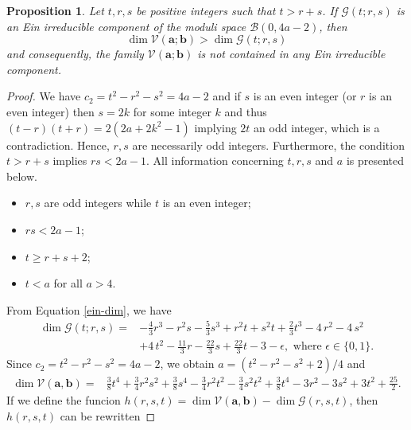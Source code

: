 \documentclass[twoside,reqno]{amsart}
\theoremstyle{plain}
\newtheorem{proposition}[theorem]{Proposition}
\begin{document}
\begin{proposition}\label{prop-dim1}
Let $t, r, s$ be positive integers such that $t>r+s$. If $\mathcal{G}(t; r,s)$ is an Ein irreducible component of the 
moduli space $\mathcal{B}(0,4a-2)$, then 
$$\dim\mathcal{V}(\boldsymbol{a}; \boldsymbol{b})>\dim \mathcal{G}(t; r,s)$$
and consequently, the 
family $\mathcal{V}(\boldsymbol{a}; \boldsymbol{b})$ is not contained in any Ein irreducible component.
\end{proposition}
%
\begin{proof}
We have $c_2=t^2-r^2-s^2=4a-2$ and if $s$ is an even integer (or $r$ is an even integer) then $s=2k$ for some integer $k$ and thus $(t-r)(t+r)=2(2a+2k^2-1)$ implying $2t$ an odd integer, which is a contradiction. Hence, $r,s$ are necessarily odd integers. Furthermore, the condition $t>r+s$ implies $rs<2a-1$. All information concerning $t, r, s$ and $a$ is presented below.
\begin{itemize}
    \item $r, s$ are odd integers while $t$ is an even integer;
    \item $rs<2a-1$;
\item $t\geq r+s+2$;
    \item $t<a$ for all $a>4$.
\end{itemize}

From Equation \eqref{ein-dim}, we have
\begin{eqnarray*}
 \dim \mathcal{G}(t; r,s)=&-\frac{4}{3}r^{3}-r^{2}s-\frac{5}{3}s^{3}+r^{2}t+s^{2}t+\frac{2}{3}t^{3}-4\,r^{2}-4\,s^{2}\\
 &+4\,t^{2}-\frac{11}{3}r-\frac{22}{3}s+\frac{22}{3}t-3-\epsilon, \mbox{ where } \epsilon \in\{0,1\}.   
\end{eqnarray*}
Since $c_2=t^2-r^2-s^2=4a-2$, we obtain $a=(t^2-r^2-s^2+2)/4$ and
$$\begin{matrix}
\dim \mathcal{V}(\boldsymbol{a},\boldsymbol{b})= & \frac{3}{8}t^{4}+\frac{3}{4}r^{2}s^{2}+\frac{3}{8}s^{4}-\frac{3}{4}r^{2}t^{2}-\frac{3}{4}s^{2}t^{2}+\frac{3}{8}t^{4}-3r^{2}-3s^{2}+3t^{2}+\frac{25}{2}.
\end{matrix}$$
 If we define the funcion $h(r,s,t)=\dim \mathcal{V}(\boldsymbol{a},\boldsymbol{b})-\dim \mathcal{G}(r,s,t)$, then $h(r,s,t)$ can be rewritten
 

\end{proof}
\end{document}

